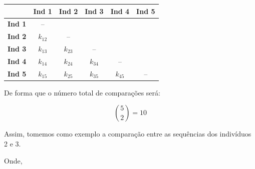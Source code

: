 \documentclass[
]{book}
\begin{document}
\begin{longtable}[]{@{}lccccc@{}}
\toprule()
& Ind 1 & Ind 2 & Ind 3 & Ind 4 & Ind 5 \\
\midrule()
\endhead
\textbf{Ind 1} & -- & & & & \\
\textbf{Ind 2} & \(k_{12}\) & -- & & & \\
\textbf{Ind 3} & \(k_{13}\) & \(k_{23}\) & -- & & \\
\textbf{Ind 4} & \(k_{14}\) & \(k_{24}\) & \(k_{34}\) & -- & \\
\textbf{Ind 5} & \(k_{15}\) & \(k_{25}\) & \(k_{35}\) & \(k_{45}\) & -- \\
\bottomrule()
\end{longtable}

De forma que o número total de comparações será:

\[\binom{5}{2}=10\]

Assim, tomemos como exemplo a comparação entre as sequências dos indivíduos 2 e 3.

Onde,
\end{document}
